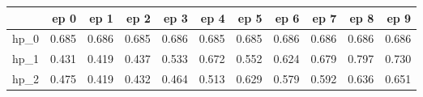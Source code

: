 \begin{tabular}{lrrrrrrrrrr}
\toprule
{} &   ep 0 &   ep 1 &   ep 2 &   ep 3 &   ep 4 &   ep 5 &   ep 6 &   ep 7 &   ep 8 &   ep 9 \\
\midrule
hp\_0 &  0.685 &  0.686 &  0.685 &  0.686 &  0.685 &  0.685 &  0.686 &  0.686 &  0.686 &  0.686 \\
hp\_1 &  0.431 &  0.419 &  0.437 &  0.533 &  0.672 &  0.552 &  0.624 &  0.679 &  0.797 &  0.730 \\
hp\_2 &  0.475 &  0.419 &  0.432 &  0.464 &  0.513 &  0.629 &  0.579 &  0.592 &  0.636 &  0.651 \\
\bottomrule
\end{tabular}
